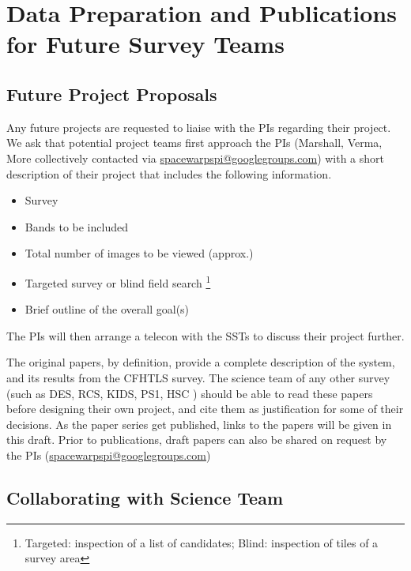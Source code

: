 \documentclass[a4paper]{article}
\begin{document}

\section{Data Preparation and Publications for Future Survey Teams}
\label{sec:series}

\subsection{Future Project Proposals}
Any future \sw projects are requested to liaise with the PIs regarding their project. We ask that potential project teams first approach the \sw PIs (Marshall, Verma, More collectively contacted via \href{mailto:spacewarpspi@googlegroups.com}{spacewarpspi@googlegroups.com}) with a short description of their project that includes the following information.

\begin{itemize}
\item Survey
\item Bands to be included
\item Total number of images to be viewed (approx.)
\item Targeted survey or blind field search \footnote{Targeted: inspection of a list of candidates; Blind: inspection of tiles of a survey area}
\item Brief outline of the overall goal(s) 
\end{itemize}

The \sw PIs will then arrange a telecon with the SSTs to discuss their project further.

The original \sw papers, by definition, provide a complete description of the system, and its results from the CFHTLS survey. The science team of
any other survey (such as DES, RCS, KIDS, PS1, HSC \etc) should be able
to read these papers before designing their own \sw project, and cite them as justification for some of their decisions. As the \sw paper series get published, links to the papers will be given in this draft. Prior to publications, draft papers can also be shared on request by the \sw PIs (\href{mailto:spacewarpspi@googlegroups.com}{spacewarpspi@googlegroups.com})

\subsection{Collaborating with \sw Science Team}
\end{document}
